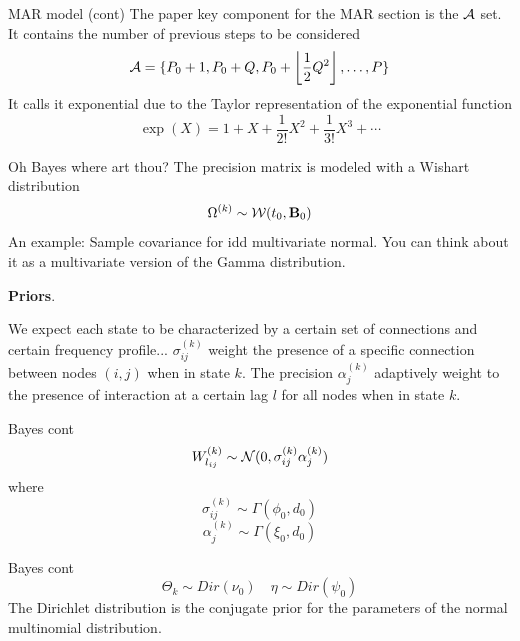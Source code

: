 \documentclass{beamer}
\begin{document}
	\begin{frame}{MAR model (cont)}
	The paper key component for the MAR section is the $\cal A$ set.
	It contains the number of previous steps to be considered
	\begin{equation}
		{\cal A}= \{ P_0 +1,P_0+Q , P_0+ \left\lfloor\frac{1}{2}Q^2\right\rfloor,\ldots,P\}
	\end{equation}
It calls it exponential due to the Taylor representation of the exponential function
\begin{equation*}
	\exp(X)= 1 + X + \frac{1}{2!}X^2 + \frac{1}{3!}X^3 + \cdots
\end{equation*}
	\end{frame}
	
\begin{frame}{Oh Bayes where art thou?}
	The precision matrix is modeled with a Wishart distribution
	\begin{equation}
		\Omega^{(k)} \sim {\cal W}(t_0,\mathbf{B}_0)
	\end{equation}
 An example: Sample covariance for idd multivariate normal. You can think about it as a multivariate version of the Gamma distribution.
 
 \textbf{Priors}.
 
 We expect each state to be characterized by a certain set of connections and certain frequency profile... $\sigma_{ij}^{(k)}$ weight the presence of a specific connection between nodes $(i,j)$ when in state $k$. The precision $\alpha_j^{(k)}$ adaptively weight to the presence of interaction at a certain lag $l$ for all nodes when in state $k$.
 
 
\end{frame}

\begin{frame}{Bayes cont}
	\begin{equation}
		W_{l_{ij}}^{(k)} \sim {\cal N}(0, \sigma_{ij}^{(k)} \alpha_j^{(k)} )
	\end{equation}
	where 
	\begin{equation}
		\sigma_{ij}^{(k)}\sim \Gamma (\phi_0, d_0)
	\end{equation}
	\begin{equation}
		\alpha_j^{(k)} \sim \Gamma (\xi_0, d_0)
	\end{equation}
\end{frame}

\begin{frame}{Bayes cont}
	\begin{equation}
		\Theta_k \sim Dir(\nu_0) \quad \eta \sim Dir (\psi_0)
	\end{equation}
The Dirichlet distribution is the conjugate prior for the parameters of the normal multinomial distribution. 
\end{frame}

	
	
	
	
	
\end{document}
